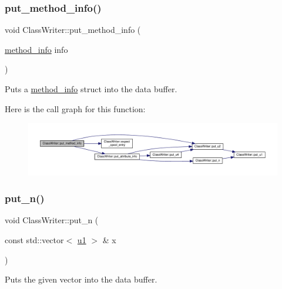 \subsubsection{\texorpdfstring{put\+\_\+method\+\_\+info()}{put\_method\_info()}}
{\footnotesize\ttfamily void Class\+Writer\+::put\+\_\+method\+\_\+info (\begin{DoxyParamCaption}\item[{\hyperlink{structmethod__info}{method\+\_\+info}}]{info }\end{DoxyParamCaption})\hspace{0.3cm}{\ttfamily [private]}}



Puts a \hyperlink{structmethod__info}{method\+\_\+info} struct into the data buffer. 

Here is the call graph for this function\+:\nopagebreak
\begin{figure}[H]
\begin{center}
\leavevmode
\includegraphics[width=350pt]{classClassWriter_a3221090999bef5f0e05993de89600670_cgraph}
\end{center}
\end{figure}
\mbox{\label{classClassWriter_aa527b917e9f3628ceaeccb95d30bfbb9}} 
\subsubsection{\texorpdfstring{put\+\_\+n()}{put\_n()}}
{\footnotesize\ttfamily void Class\+Writer\+::put\+\_\+n (\begin{DoxyParamCaption}\item[{const std\+::vector$<$ \hyperlink{types_8h_a162f47a77ee24f6f77cd8c82ccd40ab7}{u1} $>$ \&}]{x }\end{DoxyParamCaption})\hspace{0.3cm}{\ttfamily [private]}}



Puts the given vector into the data buffer. 

